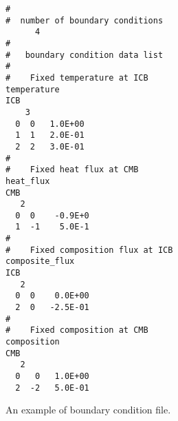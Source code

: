 %
\begin{figure}[htbp]
\begin{center}
\begin{verbatim}
#
#  number of boundary conditions
      4
#
#   boundary condition data list
#
#    Fixed temperature at ICB
temperature
ICB
    3
  0  0   1.0E+00
  1  1   2.0E-01
  2  2   3.0E-01
#
#    Fixed heat flux at CMB
heat_flux
CMB
   2
  0  0    -0.9E+0
  1  -1    5.0E-1
#
#    Fixed composition flux at ICB
composite_flux
ICB
   2
  0  0    0.0E+00
  2  0   -2.5E-01
#
#    Fixed composition at CMB
composition
CMB
   2
  0   0   1.0E+00
  2  -2   5.0E-01
\end{verbatim}
\end{center}
\caption{An example of boundary condition file.}
\label{fig:boundary_file}
\end{figure}
%

